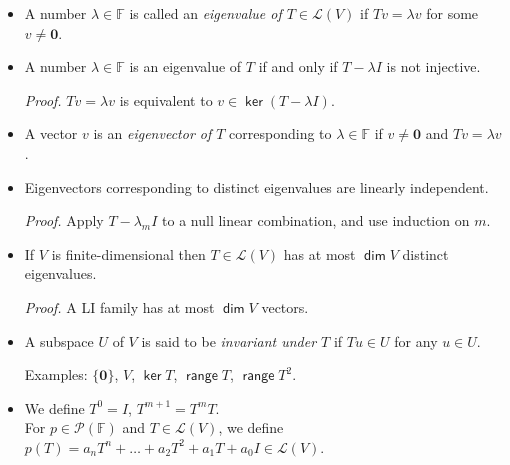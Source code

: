 \documentclass[11pt]{article}
\newcommand{\1}{\mathbf{1}}
\newcommand{\0}{\mathbf{0}}
\newcommand{\F}{\mathbb{F}}
\newcommand{\cL}{\mathcal{L}}
\newcommand{\cP}{\mathcal{P}}
\DeclareMathOperator{\myrange}{\mathsf{range}}
\DeclareMathOperator{\myker}{\mathsf{ker}}
\DeclareMathOperator{\mydim}{\mathsf{dim}}
\begin{document}
\begin{itemize}

\item

A number $\lambda \in \F$ is called an \emph{eigenvalue of $ T \in \cL(V) $} if $Tv=\lambda v$ for some $ v \ne \0$.

\item

A number $\lambda \in \F$ is an eigenvalue of $T$ if and only if $T - \lambda I$ is not injective.

\emph{Proof.}
$Tv = \lambda v$ is equivalent to $v \in \myker (T- \lambda I)$.

\item

A vector $v$ is an \emph{eigenvector of $T$} corresponding to $\lambda \in \F$ if $v \ne \0$ and $Tv = \lambda v$.

\item


Eigenvectors corresponding to distinct eigenvalues are linearly independent.

\emph{Proof.}
Apply $T - \lambda_m I$ to a null linear combination, and use induction on $m$.

\item

If $V$ is finite-dimensional then $T \in \cL(V)$ has at most $\mydim V$ distinct eigenvalues.

\emph{Proof.}
A LI family has at most $\mydim V$ vectors.

\item

A subspace $U$ of $V$ is said to be \emph{invariant under $T$} if $Tu\in U$ for any $u\in U$.

Examples:
$\{\0\}$, $V$, $\myker T$, $\myrange T$, $\myrange T^2$.

%

\item

We define $T^0 = I$, $T^{m+1}=T^m T$.
\\
For $p \in \cP(\F)$ and $T \in \cL(V)$, we define $p(T)=a_n T^n + \dots + a_2 T^2 + a_1 T + a_0 I \in \cL(V)$.


\end{itemize}
\end{document}

